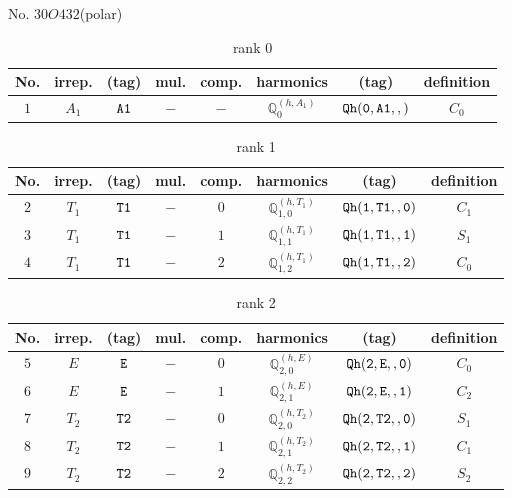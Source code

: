 \documentclass[fleqn,8pt]{jsarticle}
\begin{document}
\setcounter{MaxMatrixCols}{16}

\begin{center}
\LARGE
No. 30\quad$O$\quad$432$\quad[ cubic ] (polar)
\end{center}
\begin{table}[ht!]
\begin{center}
\caption{rank 0}
\renewcommand{\arraystretch}{1.3}
\begin{tabular}{cccccccc} \hline \hline
No. & irrep. & (tag) & mul. & comp. & harmonics & (tag) & definition \\ \hline
$ 1 $ & $ A_{1} $ & $ {\tt A1} $ & $ - $ & $ - $ & $ \mathbb{Q}_{0}^{(h,A_{1})} $ & $ {\tt Qh(0,A1,,)} $ & $ C_{0} $ \\
 \hline \hline
\end{tabular}
\end{center}
\end{table}
\begin{table}[ht!]
\begin{center}
\caption{rank 1}
\renewcommand{\arraystretch}{1.3}
\begin{tabular}{cccccccc} \hline \hline
No. & irrep. & (tag) & mul. & comp. & harmonics & (tag) & definition \\ \hline
$ 2 $ & $ T_{1} $ & $ {\tt T1} $ & $ - $ & $ 0 $ & $ \mathbb{Q}_{1,0}^{(h,T_{1})} $ & $ {\tt Qh(1,T1,,0)} $ & $ C_{1} $ \\
$ 3 $ & $ T_{1} $ & $ {\tt T1} $ & $ - $ & $ 1 $ & $ \mathbb{Q}_{1,1}^{(h,T_{1})} $ & $ {\tt Qh(1,T1,,1)} $ & $ S_{1} $ \\
$ 4 $ & $ T_{1} $ & $ {\tt T1} $ & $ - $ & $ 2 $ & $ \mathbb{Q}_{1,2}^{(h,T_{1})} $ & $ {\tt Qh(1,T1,,2)} $ & $ C_{0} $ \\
 \hline \hline
\end{tabular}
\end{center}
\end{table}
\begin{table}[ht!]
\begin{center}
\caption{rank 2}
\renewcommand{\arraystretch}{1.3}
\begin{tabular}{cccccccc} \hline \hline
No. & irrep. & (tag) & mul. & comp. & harmonics & (tag) & definition \\ \hline
$ 5 $ & $ E $ & $ {\tt E} $ & $ - $ & $ 0 $ & $ \mathbb{Q}_{2,0}^{(h,E)} $ & $ {\tt Qh(2,E,,0)} $ & $ C_{0} $ \\
$ 6 $ & $ E $ & $ {\tt E} $ & $ - $ & $ 1 $ & $ \mathbb{Q}_{2,1}^{(h,E)} $ & $ {\tt Qh(2,E,,1)} $ & $ C_{2} $ \\
$ 7 $ & $ T_{2} $ & $ {\tt T2} $ & $ - $ & $ 0 $ & $ \mathbb{Q}_{2,0}^{(h,T_{2})} $ & $ {\tt Qh(2,T2,,0)} $ & $ S_{1} $ \\
$ 8 $ & $ T_{2} $ & $ {\tt T2} $ & $ - $ & $ 1 $ & $ \mathbb{Q}_{2,1}^{(h,T_{2})} $ & $ {\tt Qh(2,T2,,1)} $ & $ C_{1} $ \\
$ 9 $ & $ T_{2} $ & $ {\tt T2} $ & $ - $ & $ 2 $ & $ \mathbb{Q}_{2,2}^{(h,T_{2})} $ & $ {\tt Qh(2,T2,,2)} $ & $ S_{2} $ \\
 \hline \hline
\end{tabular}
\end{center}
\end{table}
\end{document}
